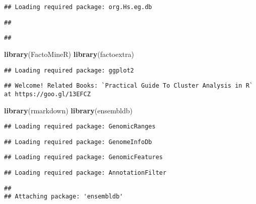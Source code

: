 \documentclass[]{article}
\newenvironment{Shaded}{\begin{snugshade}}{\end{snugshade}}
\newcommand{\KeywordTok}[1]{\textcolor[rgb]{0.13,0.29,0.53}{\textbf{#1}}}
\newcommand{\NormalTok}[1]{#1}
\begin{document}
\begin{verbatim}
## Loading required package: org.Hs.eg.db
\end{verbatim}

\begin{verbatim}
## 
\end{verbatim}

\begin{verbatim}
## 
\end{verbatim}

\begin{Shaded}
\begin{Highlighting}[]
\KeywordTok{library}\NormalTok{(FactoMineR)}
\KeywordTok{library}\NormalTok{(factoextra)}
\end{Highlighting}
\end{Shaded}

\begin{verbatim}
## Loading required package: ggplot2
\end{verbatim}

\begin{verbatim}
## Welcome! Related Books: `Practical Guide To Cluster Analysis in R` at https://goo.gl/13EFCZ
\end{verbatim}

\begin{Shaded}
\begin{Highlighting}[]
\KeywordTok{library}\NormalTok{(rmarkdown)}
\KeywordTok{library}\NormalTok{(ensembldb)}
\end{Highlighting}
\end{Shaded}

\begin{verbatim}
## Loading required package: GenomicRanges
\end{verbatim}

\begin{verbatim}
## Loading required package: GenomeInfoDb
\end{verbatim}

\begin{verbatim}
## Loading required package: GenomicFeatures
\end{verbatim}

\begin{verbatim}
## Loading required package: AnnotationFilter
\end{verbatim}

\begin{verbatim}
## 
## Attaching package: 'ensembldb'
\end{verbatim}
\end{document}
